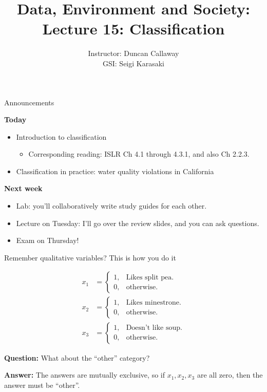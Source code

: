 \documentclass[aspectratio=169]{beamer}
\title[Lecture 15: Intro to Classification] %
{Data, Environment and Society: \\{Lecture 15: Classification}}
\author[ER190C: Data, Environment and Society] 
{Instructor: Duncan Callaway\\
GSI: Seigi Karasaki}
\institute[UC Berkeley] %
 {\small{ \bf October 11, 2018}}
\date[October 11, 2018]
\begin{document}
\begin{frame}
  \titlepage
\end{frame}

\begin{frame}{Announcements}

\textbf{Today}
\begin{itemize}
\item Introduction to classification
\begin{itemize}
\item Corresponding reading:  ISLR Ch 4.1 through 4.3.1, and also Ch 2.2.3.
\end{itemize}
\item Classification in practice: water quality violations in California
\end{itemize}

\textbf{Next week}
\begin{itemize}
\item Lab: you'll collaboratively write study guides for each other.
\item Lecture on Tuesday: I'll go over the review slides, and you can ask questions.
\item Exam on Thursday!
\end{itemize}
\end{frame}

\begin{frame}{Remember qualitative variables?  This is how you do it}

\begin{align*}
x_1 &=\begin{cases}
    1, & \text{Likes split pea}.\\
    0, & \text{otherwise}.
  \end{cases}\\
x_2 &=\begin{cases}
    1, & \text{Likes minestrone}.\\
    0, & \text{otherwise}.
  \end{cases} \\
x_3 &=\begin{cases}
    1, & \text{Doesn't like soup}.\\
    0, & \text{otherwise}.
  \end{cases}  
\end{align*}
 
  \textbf{Question:} What about the ``other'' category?  
  
  \pause
  
  \textbf{Answer: } The answers are mutually exclusive, so if $x_1, x_2, x_3$ are all zero, then the answer must be ``other''.

\end{frame}
\end{document}
